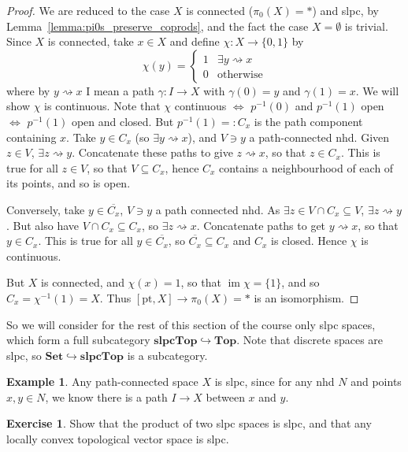 \documentclass{tufte-handout}
\def\pt {\mathrm{pt}}
\def\Set {\mathbf{Set}}
\def\Top {\mathbf{Top}}
\def\slpcTop {\mathbf{slpcTop}}
\DeclareMathOperator{\im}{im}
\theoremstyle{definition}
\newtheorem{example}{Example}
\newtheorem{ex}{Exercise}
\begin{document}
\begin{proof}
We are reduced to the case $X$ is connected ($\pi_0(X) = *$) and slpc, by Lemma~\ref{lemma:pi0s_preserve_coprods}, 
and the fact the case $X=\emptyset$ is trivial.
Since $X$ is connected, take $x\in X$ and define $\chi\colon X\to \{0,1\}$ by
\[
	\chi(y) = \begin{cases}
			1 & \exists y \rightsquigarrow x \\
			0 & \text{otherwise}
		\end{cases}
\]
where by $y\rightsquigarrow x$ I mean a path $\gamma\colon I\to X$ with $\gamma(0)=y$ and $\gamma(1)=x$.
We will show $\chi$ is continuous. Note that $\chi$ continuous $\Leftrightarrow$ $p^{-1}(0)$ and $p^{-1}(1)$ open $\Leftrightarrow$ $p^{-1}(1)$ open and closed. But $p^{-1}(1)=:C_x$ is the path component containing $x$.
Take $y\in C_x$ (so $\exists y\rightsquigarrow x$), and $V\ni y$ a path-connected nhd. Given $z\in V$, $\exists z\rightsquigarrow y$. Concatenate these paths to give
$z\rightsquigarrow x$, so that $z\in C_x$. This is true for all $z\in V$, so that $V\subseteq C_x$, hence $C_x$ contains a neighbourhood of each of its points, and so is open.

Conversely, take $y\in \overline{C_x}$, $V\ni y$ a path connected nhd. As $\exists z\in V\cap C_x \subseteq V$,
$\exists z\rightsquigarrow y$. But also have $V\cap C_x \subseteq C_x$, so $\exists z\rightsquigarrow x$. Concatenate paths to get $y\rightsquigarrow x$, so that $y\in C_x$.
This is true for all $y\in \overline{C_x}$, so $\overline{C_x} \subseteq C_x$ and $C_x$ is closed. Hence $\chi$ is continuous.

But $X$ is connected, and $\chi(x) = 1$, so that $\im\chi=\{1\}$, and so $C_x = \chi^{-1}(1) = X$. 
Thus $[\pt,X] \to \pi_0(X) = *$ is an isomorphism.
\end{proof}

So we will consider for the rest of this section of the course only slpc spaces, which form a full 
subcategory $\slpcTop \hookrightarrow \Top$.
Note that discrete spaces are slpc, so $\Set \hookrightarrow \slpcTop$ is a subcategory.

\begin{example}
Any path-connected space $X$ is slpc, since for any nhd $N$ and points $x,y\in N$, we know there is a
path $I\to X$ between $x$ and $y$.
\end{example}

\begin{ex}
Show that the product of two slpc spaces is slpc, and that any locally convex topological vector space is slpc.
\end{ex}
\end{document}
